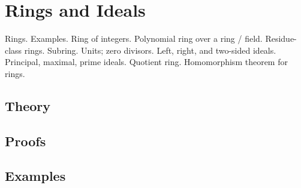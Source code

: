 
\section{Rings and Ideals}
\label{sec:2.2.13-rings-ideals}

\begin{ticket}
Rings. Examples. Ring of integers. Polynomial ring over a ring / field. Residue-class rings. Subring. Units; zero divisors. Left, right, and two-sided ideals. Principal, maximal, prime ideals. Quotient ring. Homomorphism theorem for rings.
\end{ticket}

\subsection*{Theory}

\subsection*{Proofs}

\subsection*{Examples}
